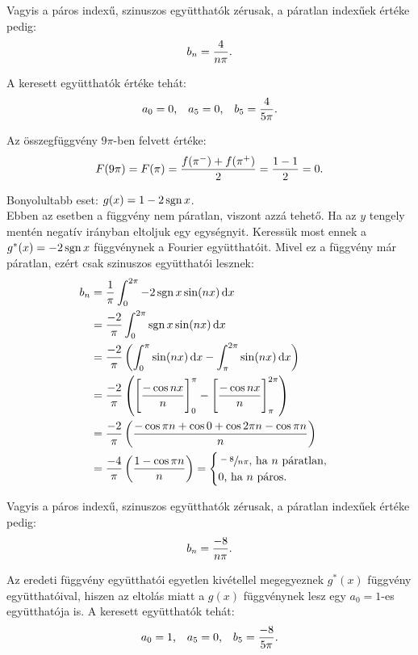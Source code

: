 \begin{exercise}
{    Vagyis a páros indexű, szinuszos együtthatók zérusak, a páratlan indexűek
    értéke pedig:
    \[
      b_n = \frac{4}{n\pi}
      \text.
    \]

    A keresett együtthatók értéke tehát:
    \[
      a_0 = 0
      \text,
      \quad
      a_5 = 0
      \text,
      \quad
      b_5 = \frac{4}{5 \pi}
      \text.
    \]

    Az összegfüggvény $9\pi$-ben felvett értéke:
    \[
      F(9 \pi) = F(\pi) = \frac{f(\pi^-) + f(\pi^+)}{2} = \frac{1-1}{2} = 0
      \text.
    \]

    \tcbline

    Bonyolultabb eset: $g(x) = 1 - 2\operatorname{sgn} x$. \\[3mm]
    Ebben az esetben a függvény nem páratlan, viszont azzá tehető. Ha az $y$
    tengely mentén negatív irányban eltoljuk egy egységnyit. Keressük most ennek
    a $g^*(x) = -2 \operatorname{sgn} x$ függvénynek a Fourier együtthatóit. Mivel ez a
    függvény már páratlan, ezért csak szinuszos együtthatói lesznek:
    \begin{align*}
      b_n
       & = \frac{1}{\pi} \int_0^{2\pi} -2\sgn x \sin(n x) \, \mathrm d x
      \\
       & = \frac{-2}{\pi} \int_0^{2\pi} \sgn x \sin(n x) \, \mathrm d x
      \\
       & = \frac{-2}{\pi} \left(
      \int_0^{\pi} \sin(n x) \, \mathrm d x -
      \int_\pi^{2\pi} \sin(n x) \, \mathrm d x
      \right)
      \\
       & = \frac{-2}{\pi} \left(
      \Bigg[ \frac{-\cos nx}{n} \Bigg]_{0}^{\pi} -
      \Bigg[ \frac{-\cos nx}{n} \Bigg]_{\pi}^{2\pi}
      \right)
      \\
       & = \frac{-2}{\pi} \left(
      \frac{%
        - \cos \pi n
        + \cos 0
        + \cos 2 \pi n
        - \cos \pi n
      }{n}
      \right)
      \\
       & = \frac{-4}{\pi} \left(
      \frac{1 - \cos \pi n}{n}
      \right)
      = \begin{cases}
          \sfrac{-8}{n \pi} \text{, ha } n \text{ páratlan,} \\
          0 \text{, ha } n \text{ páros.}
        \end{cases}
    \end{align*}

    Vagyis a páros indexű, szinuszos együtthatók zérusak, a páratlan indexűek
    értéke pedig:
    \[
      b_n = \frac{-8}{n\pi}
      \text.
    \]

    Az eredeti függvény együtthatói egyetlen kivétellel megegyeznek $g^*(x)$
    függvény együtthatóival, hiszen az eltolás miatt a $g(x)$ függvénynek
    lesz egy $a_0 = 1$-es együtthatója is. A keresett együtthatók tehát:
    \[
      a_0 = 1
      \text,
      \quad
      a_5 = 0
      \text,
      \quad
      b_5 = \frac{-8}{5 \pi}
      \text.
    \]

}
\end{exercise}
